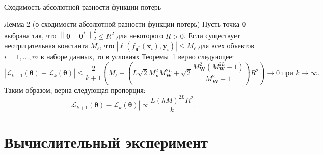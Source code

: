 \documentclass[aspectratio=169]{beamer}
\begin{document}
\begin{frame}{Сходимость абсолютной разности функции потерь}
    \fontsize{9pt}{10pt}\selectfont
    \vspace{1em}
    \begin{block}{Лемма 2 (о сходимости абсолютной разности функции потерь)}
        Пусть точка $\boldsymbol{\theta}$ выбрана так, что $\left\|\boldsymbol{\theta} - \boldsymbol{\theta}^*\right\|_2^2 \leqslant R^2$ для некоторого $R > 0$. Если существует неотрицательная константа $M_{\ell}$, что $\left| \ell(f_{\boldsymbol{\theta}^*}(\mathbf{x}_{i}), \mathbf{y}_{i}) \right| \leqslant M_{\ell}$ для всех объектов $i = 1, \ldots, m$ в наборе данных, то в условиях Теоремы~1 верно следующее:
        \[ \left| \mathcal{L}_{k+1}(\boldsymbol{\theta}) - \mathcal{L}_k(\boldsymbol{\theta}) \right| \leqslant \dfrac{2}{k+1}\left( M_{\ell} + \left( L \sqrt{2} M_{\mathbf{x}}^2 M_{\mathbf{W}}^{2L} + \sqrt{2} \dfrac{M_{\mathbf{W}}^2 (M_{\mathbf{W}}^{2L} - 1)}{M_{\mathbf{W}}^2 - 1} \right) R^2 \right) \to 0 \text{ при } k \to \infty. \]
        Таким образом, верна следующая пропорция:
        \begin{equation*}
            \left| \mathcal{L}_{k+1}(\boldsymbol{\theta}) - \mathcal{L}_k(\boldsymbol{\theta}) \right| \propto \dfrac{L (hM)^{2L} R^2}{k}. 
        \end{equation*}
    \end{block}
\end{frame}

\section{Вычислительный эксперимент}
\end{document}
